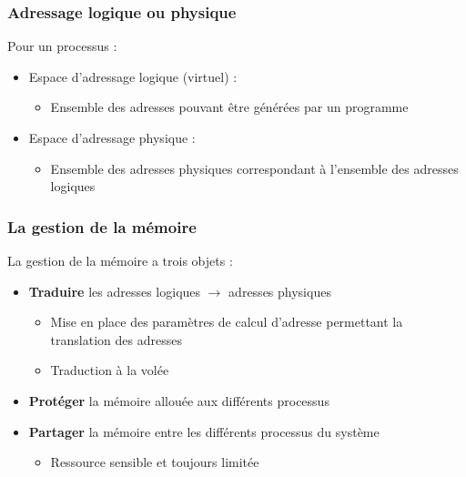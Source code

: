\begin{frame}
\frametitle{Adressage logique ou physique}
Pour un processus :
\begin{itemize}
\item Espace d’adressage logique (virtuel) :
\begin{itemize}
\item Ensemble des adresses pouvant être générées par un programme
\end{itemize}
\item Espace d’adressage physique :
\begin{itemize}
\item Ensemble des adresses physiques correspondant à l'ensemble des adresses logiques
\end{itemize}
\end{itemize}
\end{frame}


\begin{frame}
\frametitle{La gestion de la mémoire}
La gestion de la mémoire a trois objets :
\begin{itemize}
\item <1> \textbf{Traduire} les adresses logiques $\rightarrow$ adresses physiques
\begin{itemize}
\item Mise en place des paramètres de calcul d'adresse permettant la translation des adresses
\item Traduction à la volée
\end{itemize}

\item <2> \textbf{Protéger} la mémoire allouée aux différents processus

\item <3> \textbf{Partager}  la mémoire entre les différents processus du système
\begin{itemize}
\item Ressource sensible et toujours limitée
\end{itemize}

\end{itemize}
\end{frame}

